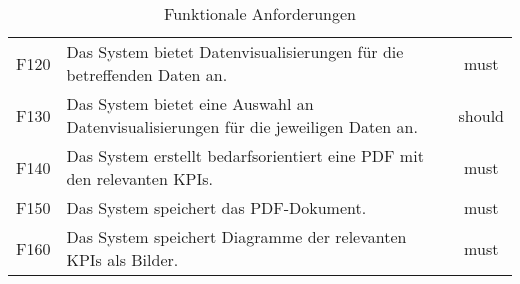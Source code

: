 \begin{table}[H]
\begin{adjustbox}{max width=\textwidth}
\begin{tabular}{llc}
        F120                              &Das System bietet Datenvisualisierungen für die betreffenden Daten an. & must\\
        F130                              &Das System bietet eine Auswahl an Datenvisualisierungen für die jeweiligen Daten an. & should\\
        F140                              &Das System erstellt bedarfsorientiert eine PDF mit den relevanten KPIs. & must\\
        F150                              &Das System speichert das PDF-Dokument. & must\\
        F160                              &Das System speichert Diagramme der relevanten KPIs als Bilder. & must\\
        \bottomrule
    \end{tabular}
    \end{adjustbox}
    \caption{%
        Funktionale Anforderungen
    }
    \label{tab:funktionale Anforderungen}
    \end{table}
\endgroup









